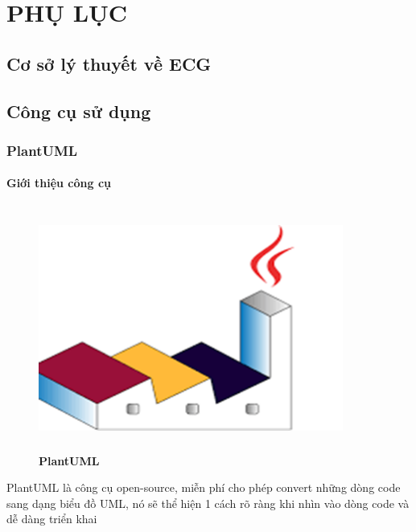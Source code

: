 
\section*{PHỤ LỤC}

\subsection{Cơ sở lý thuyết về ECG}


\subsection{Công cụ sử dụng}


\subsubsection{PlantUML}

\paragraph{Giới thiệu công cụ}
\mbox{}

\begin{figure}[H]
  \centering
  \includegraphics[width=10cm,height=8cm]{Images/appendix/plantuml.png}
  \caption[PlantUML]{\bfseries \fontsize{12pt}{0pt}
  \selectfont PlantUML}
  \label{plantuml} %
\end{figure}


PlantUML là công cụ open-source, miễn phí cho phép convert những dòng code sang dạng biểu đồ UML, nó sẽ thể hiện 1 cách rõ ràng khi nhìn vào dòng code và dễ dàng triển khai


